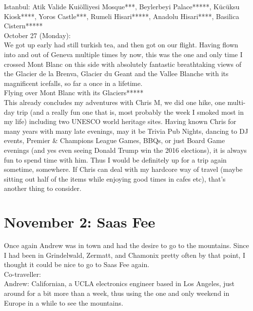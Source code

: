Istanbul: Atik Valide Kui\"olliyesi Mosque***, Beylerbeyi Palace*****, K\"uc\"uksu Kiosk****, Yoros Castle***, Rumeli Hisari*****, Anadolu Hisari****, Basilica Cistern*****\\

October 27 (Monday):\\
We got up early had still turkish tea, and then got on our flight. Having flown into and out of Geneva multiple times by now, this was the one and only time I crossed Mont Blanc on this side with absolutely fantastic breathtaking views of the Glacier de la Brenva, Glacier du Geant and the Vallee Blanche with its magnificent icefalls, so far a once in a lifetime.\\

Flying over Mont Blanc with its Glaciers*****\\

This already concludes my adventures with Chris M, we did one hike, one multi-day trip (and a really fun one that is, most probably the week I smoked most in my life) including two UNESCO world heritage sites. Having known Chris for many years with many late evenings, may it be Trivia Pub Nights, dancing to DJ events, Premier \& Champions League Games, BBQs, or just Board Game evenings (and yes even seeing Donald Trump win the 2016 elections), it is always fun to spend time with him. Thus I would be definitely up for a trip again sometime, somewhere. If Chris can deal with my hardcore way of travel (maybe sitting out half of the items while enjoying good times in cafes etc), that's another thing to consider.

\section{November 2: Saas Fee}
\label{SaasFee2014}

Once again Andrew was in town and had the desire to go to the mountains. Since I had been in Grindelwald, Zermatt, and Chamonix pretty often by that point, I thought it could be nice to go to Saas Fee again.\\

Co-traveller:\\
Andrew: Californian, a UCLA electronics engineer based in Los Angeles, just around for a bit more than a week, thus using the one and only weekend in Europe in a while to see the mountains.\\

